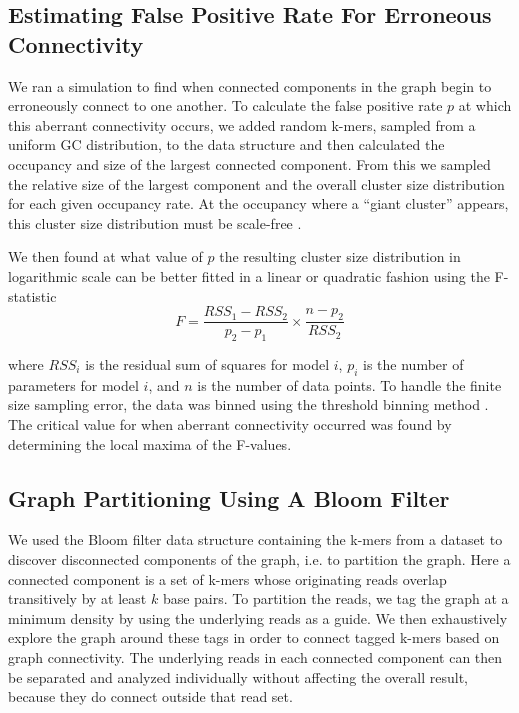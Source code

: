 \documentclass[12pt]{article} \usepackage{simplemargins}
\begin{document}
\subsection{Estimating False Positive Rate For Erroneous Connectivity}
We ran a simulation to find when connected components in the graph 
begin to erroneously connect to one another.
To calculate the false positive rate $p$ at which this aberrant 
connectivity occurs, 
we added random k-mers, sampled from a uniform GC distribution, to the data structure 
and then calculated the occupancy and size of 
the largest connected 
component. From this we sampled the relative size of 
the largest component and the overall cluster size distribution for each
given occupancy rate.
At the occupancy where a ``giant cluster'' appears, this cluster size distribution 
must be scale-free \cite{stauffer1979scaling}. 

We then found at what value of $p$ the resulting 
cluster size distribution in logarithmic 
scale can be better fitted in a linear or quadratic fashion using 
the F-statistic
\newline
\newline
\begin{displaymath}
F=\frac{RSS_1-RSS_2}{p_2-p_1} \times \frac{n - p_2}{RSS_2}
\end{displaymath}

where $RSS_i$ is the residual sum of squares for model $i$, $p_i$ is 
the number of parameters for model $i$, and $n$ is the number of data 
points. To handle the finite size sampling error, the data was binned using the 
threshold binning method \cite{adami2002critical}. The critical value for 
when aberrant connectivity occurred was found by determining the local maxima 
of the F-values.

\subsection{Graph Partitioning Using A Bloom Filter}
We used the Bloom filter data structure containing the k-mers from a
dataset to discover disconnected components of the graph, i.e. to
partition the graph.  Here a connected component is a set of k-mers
whose originating reads overlap transitively by at least $k$ base
pairs.  To partition the reads, we tag the graph at a minimum density
by using the underlying reads as a guide. We then exhaustively explore
the graph around these tags in order to connect tagged k-mers based on
graph connectivity.  The underlying reads in each connected component
can then be separated and analyzed individually without affecting the
overall result, because they do connect outside that read set.
\end{document}
